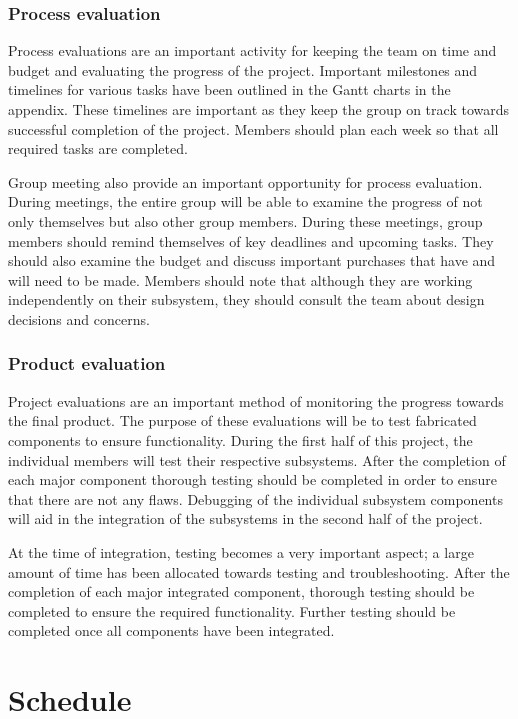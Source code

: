 \documentclass[11pt]{report}
\begin{document}
\subsubsection{Process evaluation}
Process evaluations are an important activity for keeping the team on time and budget and evaluating the progress of the project. Important milestones and timelines for various tasks have been outlined in the Gantt charts in the appendix. These timelines are important as they keep the group on track towards successful completion of the project. Members should plan each week so that all required tasks are completed.

Group meeting also provide an important opportunity for process evaluation. During meetings, the entire group will be able to examine the progress of not only themselves but also other group members. During these meetings, group members should remind themselves of key deadlines and upcoming tasks. They should also examine the budget and discuss important purchases that have and will need to be made. Members should note that although they are working independently on their subsystem, they should consult the team about design decisions and concerns.
\subsubsection{Product evaluation}

Project evaluations are an important method of monitoring the progress towards the final product. The purpose of these evaluations will be to test fabricated components to ensure functionality. During the first half of this project, the individual members will test their respective subsystems. After the completion of each major component thorough testing should be completed in order to ensure that there are not any flaws. Debugging of the individual subsystem components will aid in the integration of the subsystems in the second half of the project. 

At the time of integration, testing becomes a very important aspect; a large amount of time has been allocated towards testing and troubleshooting. After the completion of each major integrated component, thorough testing should be completed to ensure the required functionality. Further testing should be completed once all components have been integrated. 

\section{Schedule}
\newpage
\end{document}
